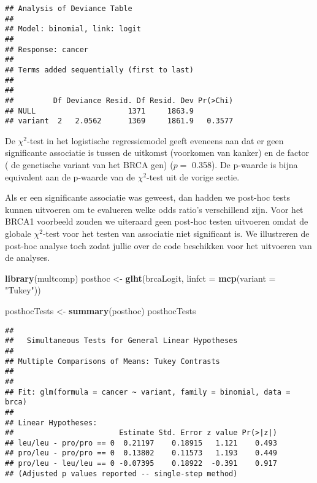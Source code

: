\documentclass[
  12pt,dutch,coursenotes]{book}
\newenvironment{Shaded}{\begin{snugshade}}{\end{snugshade}}
\newcommand{\DataTypeTok}[1]{\textcolor[rgb]{0.13,0.29,0.53}{#1}}
\newcommand{\KeywordTok}[1]{\textcolor[rgb]{0.13,0.29,0.53}{\textbf{#1}}}
\newcommand{\NormalTok}[1]{#1}
\newcommand{\StringTok}[1]{\textcolor[rgb]{0.31,0.60,0.02}{#1}}
\theoremstyle{definition}
\theoremstyle{definition}
\theoremstyle{definition}
\theoremstyle{remark}
\begin{document}
\begin{verbatim}
## Analysis of Deviance Table
## 
## Model: binomial, link: logit
## 
## Response: cancer
## 
## Terms added sequentially (first to last)
## 
## 
##         Df Deviance Resid. Df Resid. Dev Pr(>Chi)
## NULL                     1371     1863.9         
## variant  2   2.0562      1369     1861.9   0.3577
\end{verbatim}

De \(\chi^2\)-test in het logistische regressiemodel geeft eveneens aan dat er geen significante associatie is tussen de uitkomst (voorkomen van kanker) en de factor ( de genetische variant van het BRCA gen) (\(p=\) 0.358).
De p-waarde is bijna equivalent aan de p-waarde van de \(\chi^2\)-test uit de vorige sectie.

Als er een significante associatie was geweest, dan hadden we post-hoc tests kunnen uitvoeren om te evalueren welke odds ratio's verschillend zijn.
Voor het BRCA1 voorbeeld zouden we uiteraard geen post-hoc testen uitvoeren omdat de globale \(\chi^2\)-test voor het testen van associatie niet significant is.
We illustreren de post-hoc analyse toch zodat jullie over de code beschikken voor het uitvoeren van de analyses.

\begin{Shaded}
\begin{Highlighting}[]
\KeywordTok{library}\NormalTok{(multcomp)}
\NormalTok{posthoc \textless{}{-}}\StringTok{ }\KeywordTok{glht}\NormalTok{(brcaLogit, }\DataTypeTok{linfct =} \KeywordTok{mcp}\NormalTok{(}\DataTypeTok{variant =} \StringTok{"Tukey"}\NormalTok{))}

\NormalTok{posthocTests \textless{}{-}}\StringTok{ }\KeywordTok{summary}\NormalTok{(posthoc)}
\NormalTok{posthocTests}
\end{Highlighting}
\end{Shaded}

\begin{verbatim}
## 
##   Simultaneous Tests for General Linear Hypotheses
## 
## Multiple Comparisons of Means: Tukey Contrasts
## 
## 
## Fit: glm(formula = cancer ~ variant, family = binomial, data = brca)
## 
## Linear Hypotheses:
##                        Estimate Std. Error z value Pr(>|z|)
## leu/leu - pro/pro == 0  0.21197    0.18915   1.121    0.493
## pro/leu - pro/pro == 0  0.13802    0.11573   1.193    0.449
## pro/leu - leu/leu == 0 -0.07395    0.18922  -0.391    0.917
## (Adjusted p values reported -- single-step method)
\end{verbatim}
\end{document}
